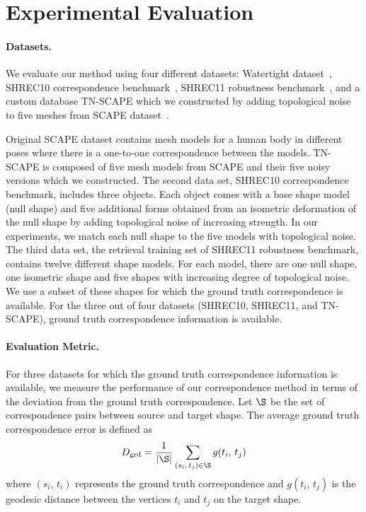 
\section{Experimental Evaluation}
\label{sec:evaluation}
\paragraph*{Datasets.}
We evaluate our method using four different datasets: Watertight dataset~\cite{giorgi2007shrec}, SHREC10 correspondence benchmark~\cite{bronstein2010shrecCorr}, SHREC11 robustness benchmark~\cite{bronstein2010shrec}, and a custom database TN-SCAPE which we constructed  by adding topological noise to five meshes from SCAPE dataset~\cite{anguelov2005scape}.

Original SCAPE dataset contains mesh models for a human body in different poses where there is a one-to-one correspondence between the models. TN-SCAPE is composed of five mesh models  from SCAPE and their five noisy versions which we constructed. 
The second data set, SHREC10 correspondence benchmark, includes three objects. Each object comes with a base shape model (null shape)  and five additional forms obtained from an isometric deformation of the null shape by adding topological noise of increasing strength. In our experiments, we match each null shape to the five models with topological noise.
The third data set, the retrieval training set of SHREC11 robustness benchmark,  contains twelve different shape models. For each model, there are one null shape, one isometric shape and five shapes with increasing degree of topological noise. We use a subset of these shapes for which the ground truth correspondence is available. 
%
For  the three out of four datasets (SHREC10, SHREC11, and TN-SCAPE), ground truth correspondence information is available.

\paragraph*{Evaluation Metric.}
For  three datasets for which the ground truth correspondence information is available,  we measure the performance of our correspondence method in terms of the deviation from the ground truth correspondence. Let $\S$ be the set of correspondence pairs between source and target shape. The average ground truth correspondence error is defined as
\begin{equation}
D_{\mathrm{grd}} = \frac{1}{|\S|} \sum_{(s_i, \, t_j) \in \S} {g(t_i, \, t_j)}
\label{eqn:Dgrd}
\end{equation}
where $(s_i, \, t_i)$ represents the ground truth correspondence and $g(t_i, \, t_j)$ is the geodesic distance between the vertices $t_i$ and $t_j$ on the target shape.

